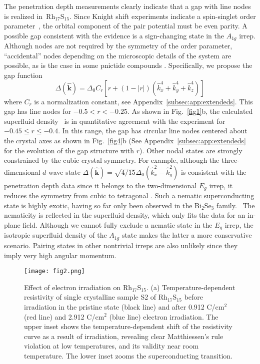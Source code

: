 \documentclass[aps,pra,reprint,superscriptaddress,floatfix]{revtex4-2}
\newcommand{\rhs}{Rh$_{17}$S$_{15}$}
\begin{document}
The penetration depth measurements clearly indicate that a gap with line nodes is realized in~\rhs. Since Knight shift experiments indicate a spin-singlet order parameter~\cite{Koyama2010}, the orbital component of the pair potential must be even parity. A possible gap consistent with the evidence is a sign-changing state in the $A_{1g}$ irrep. Although nodes are not required by the symmetry of the order parameter, ``accidental'' nodes depending on the microscopic details
of the system are possible, as is the case in some pnictide compounds \cite{Yamashita2011}. Specifically, we propose the gap function
\begin{equation}\label{eq:gap}
    \Delta(\hat{\bm{k}}) = \Delta_0 C_r[r+(1-|r|)(\hat{k}_x^4 + \hat{k}_y^4 + \hat{k}_z^4)]
\end{equation}
where $C_r$ is a normalization constant, see Appendix~\ref{subsec:app:extendeds}. This gap has line nodes for $-0.5<r<-0.25$. As shown in Fig.~\ref{fig1}b, the calculated superfluid density~\cite{Prozorov2006} is in quantitative agreement with the experiment for $-0.45\leq r \leq -0.4$. In this range, the gap has circular line nodes centered about the crystal axes as shown in Fig.~\ref{fig4}b (See Appendix~\ref{subsec:app:extendeds} for the evolution of the gap structure with $r$). 
Other nodal states are strongly constrained by the cubic crystal symmetry. 
For example, although the three-dimensional $d$-wave state $\Delta(\hat{\bm k}) = \sqrt{{4}/{15}}\Delta_0(\hat{k}_x^2 - \hat{k}_y^2)$ is consistent with the penetration depth data since it belongs to the two-dimensional $E_g$ irrep, it reduces the symmetry from cubic to tetragonal \cite{Sigrist1991}.
Such a nematic superconducting state is highly exotic, having so far only been observed in the Bi$_2$Se$_3$ family.~\cite{Matano2016} The nematicity is reflected in the superfluid density, which only fits the data for an in-plane field. Although we cannot fully exclude a nematic state in the $E_g$ irrep, the isotropic superfluid density of the $A_{1g}$ state makes the latter a more conservative scenario. Pairing states in other nontrivial irreps are also unlikely since they imply very high angular momentum.  

\begin{figure}
\texttt{[image: fig2.png]}%
\caption{\label{fig2} Effect of electron irradiation on \rhs. (a) Temperature-dependent resistivity of single crystalline sample S2 of Rh$_{17}$S$_{15}$ before irradiation in the pristine state (black line) and after 0.912 C/cm$^2$ (red line) and 2.912 C/cm$^2$ (blue line) electron irradiation. The upper inset shows the temperature-dependent shift of the resistivity curve as a result of irradiation, revealing clear Matthiessen's rule violation at low temperatures, and its validity near room temperature. The lower inset zooms the superconducting transition.
}
\label{resistivity}
\end{figure}
\end{document}
